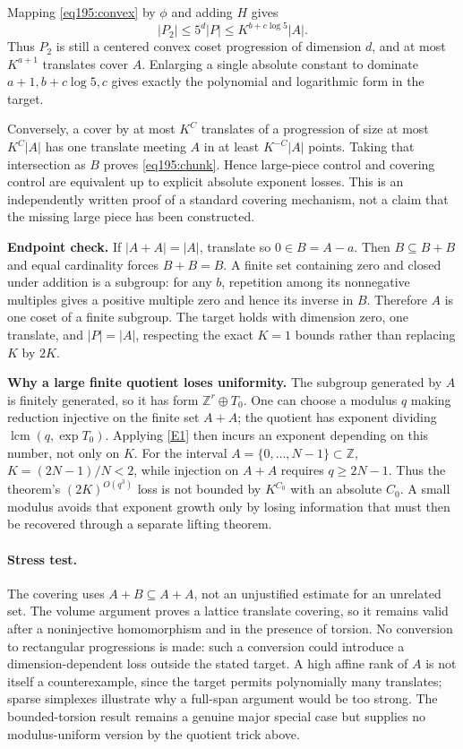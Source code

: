 \documentclass[11pt,a4paper]{article}
\newcommand{\Z}{\mathbb{Z}}
\newcommand{\eref}[2]{\hyperlink{extra:#1:#2}{[E#2]}}
\numberwithin{equation}{section}
\begin{document}
Mapping \eqref{eq195:convex} by $\phi$ and adding $H$ gives
\[
 |P_2|\le5^d|P|\le K^{b+c\log5}|A|.
\]
Thus $P_2$ is still a centered convex coset progression of dimension $d$, and at most $K^{a+1}$ translates cover $A$. Enlarging a single absolute constant to dominate $a+1,b+c\log5,c$ gives exactly the polynomial and logarithmic form in the target.

Conversely, a cover by at most $K^C$ translates of a progression of size at most $K^C|A|$ has one translate meeting $A$ in at least $K^{-C}|A|$ points. Taking that intersection as $B$ proves \eqref{eq195:chunk}. Hence large-piece control and covering control are equivalent up to explicit absolute exponent losses. This is an independently written proof of a standard covering mechanism, not a claim that the missing large piece has been constructed.

\textbf{Endpoint check.} If $|A+A|=|A|$, translate so $0\in B=A-a$. Then $B\subseteq B+B$ and equal cardinality forces $B+B=B$. A finite set containing zero and closed under addition is a subgroup: for any $b$, repetition among its nonnegative multiples gives a positive multiple zero and hence its inverse in $B$. Therefore $A$ is one coset of a finite subgroup. The target holds with dimension zero, one translate, and $|P|=|A|$, respecting the exact $K=1$ bounds rather than replacing $K$ by $2K$.

\textbf{Why a large finite quotient loses uniformity.} The subgroup generated by $A$ is finitely generated, so it has form $\Z^r\oplus T_0$. One can choose a modulus $q$ making reduction injective on the finite set $A+A$; the quotient has exponent dividing $\operatorname{lcm}(q,\exp T_0)$. Applying \eref{195}{1} then incurs an exponent depending on this number, not only on $K$. For the interval $A=\{0,\ldots,N-1\}\subset\Z$, $K=(2N-1)/N<2$, while injection on $A+A$ requires $q\ge2N-1$. Thus the theorem's $(2K)^{O(q^3)}$ loss is not bounded by $K^{C_0}$ with an absolute $C_0$. A small modulus avoids that exponent growth only by losing information that must then be recovered through a separate lifting theorem.

\paragraph{Stress test.}
The covering uses $A+B\subseteq A+A$, not an unjustified estimate for an unrelated set. The volume argument proves a lattice translate covering, so it remains valid after a noninjective homomorphism and in the presence of torsion. No conversion to rectangular progressions is made: such a conversion could introduce a dimension-dependent loss outside the stated target. A high affine rank of $A$ is not itself a counterexample, since the target permits polynomially many translates; sparse simplexes illustrate why a full-span argument would be too strong. The bounded-torsion result remains a genuine major special case but supplies no modulus-uniform version by the quotient trick above.
\end{document}
